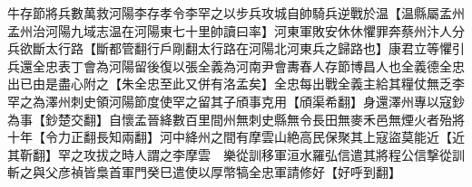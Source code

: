 牛存節將兵數萬救河陽李存孝令李罕之以步兵攻城自帥騎兵逆戰於温【温縣屬孟州孟州治河陽九域志温在河陽東七十里帥讀曰率】河東軍敗安休休懼罪奔蔡州汴人分兵欲斷太行路【斷都管翻行戶剛翻太行路在河陽北河東兵之歸路也】康君立等懼引兵還全忠表丁會為河陽留後復以張全義為河南尹會夀春人存節博昌人也全義德全忠出已由是盡心附之【朱全忠至此又併有洛孟矣】全忠每出戰全義主給其糧仗無乏李罕之為澤州刺史領河陽節度使罕之留其子頎事克用【頎渠希翻】身還澤州專以寇鈔為事【鈔楚交翻】自懷孟晉絳數百里間州無刺史縣無令長田無麥禾邑無煙火者殆將十年【令力正翻長知兩翻】河中絳州之間有摩雲山絶高民保聚其上寇盜莫能近【近其靳翻】罕之攻拔之時人謂之李摩雲　樂從訓移軍洹水羅弘信遣其將程公信撃從訓斬之與父彦禎皆梟首軍門癸巳遣使以厚幣犒全忠軍請修好【好呼到翻】